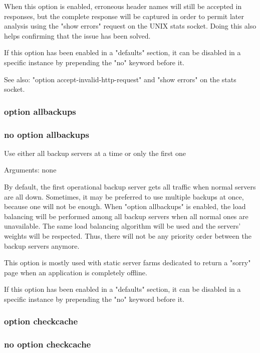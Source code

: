   When this option is enabled, erroneous header names will still be accepted in
  responses, but the complete response will be captured in order to permit
  later analysis using the "show errors" request on the UNIX stats socket.
  Doing this also helps confirming that the issue has been solved.

  If this option has been enabled in a "defaults" section, it can be disabled
  in a specific instance by prepending the "no" keyword before it.

  See also: "option accept-invalid-http-request" and "show errors" on the
             stats socket.

\subsubsection{option allbackups}
\subsubsection{no option allbackups}


  Use either all backup servers at a time or only the first one


  Arguments: none

  By default, the first operational backup server gets all traffic when normal
  servers are all down. Sometimes, it may be preferred to use multiple backups
  at once, because one will not be enough. When "option allbackups" is enabled,
  the load balancing will be performed among all backup servers when all normal
  ones are unavailable. The same load balancing algorithm will be used and the
  servers' weights will be respected. Thus, there will not be any priority
  order between the backup servers anymore.

  This option is mostly used with static server farms dedicated to return a
  "sorry" page when an application is completely offline.

  If this option has been enabled in a "defaults" section, it can be disabled
  in a specific instance by prepending the "no" keyword before it.

\subsubsection{option checkcache}
\subsubsection{no option checkcache}

